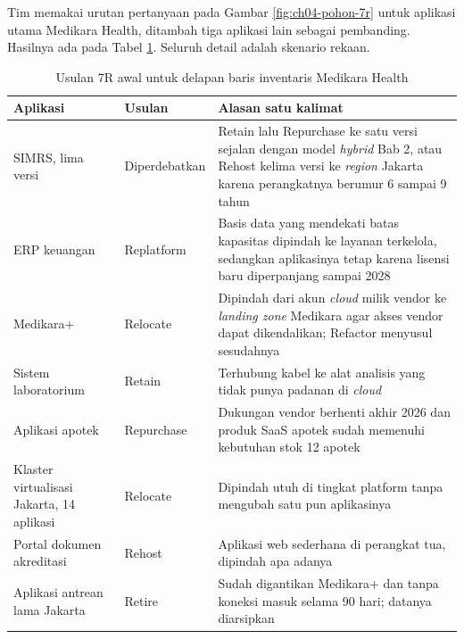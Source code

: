 \begin{kasus}[title={Kasus Medikara Health: Usulan 7R untuk Lima Aplikasi Utama}]
  Tim memakai urutan pertanyaan pada Gambar \ref{fig:ch04-pohon-7r} untuk aplikasi utama
  Medikara Health, ditambah tiga aplikasi lain sebagai pembanding. Hasilnya ada pada Tabel
  \ref{tab:ch04-usulan-medikara}. Seluruh detail adalah skenario rekaan.

  \begin{table}[H]
    \centering
    \footnotesize
    \caption{Usulan 7R awal untuk delapan baris inventaris Medikara Health}
    \label{tab:ch04-usulan-medikara}
    \begin{tabularx}{\linewidth}{>{\raggedright\arraybackslash}p{2.4cm}
                                 >{\raggedright\arraybackslash}p{2.1cm}
                                 >{\raggedright\arraybackslash}X}
      \hline
      \textbf{Aplikasi} & \textbf{Usulan} & \textbf{Alasan satu kalimat} \\
      \hline
      SIMRS, lima versi & Diperdebatkan & Retain lalu Repurchase ke satu versi sejalan
        dengan model \textit{hybrid} Bab 2, atau Rehost kelima versi ke \textit{region}
        Jakarta karena perangkatnya berumur 6 sampai 9 tahun \\
      \hline
      ERP keuangan & Replatform & Basis data yang mendekati batas kapasitas dipindah ke
        layanan terkelola, sedangkan aplikasinya tetap karena lisensi baru diperpanjang
        sampai 2028 \\
      \hline
      Medikara+ & Relocate & Dipindah dari akun \textit{cloud} milik vendor ke
        \textit{landing zone} Medikara agar akses vendor dapat dikendalikan; Refactor
        menyusul sesudahnya \\
      \hline
      Sistem laboratorium & Retain & Terhubung kabel ke alat analisis yang tidak punya
        padanan di \textit{cloud} \\
      \hline
      Aplikasi apotek & Repurchase & Dukungan vendor berhenti akhir 2026 dan produk SaaS
        apotek sudah memenuhi kebutuhan stok 12 apotek \\
      \hline
      Klaster virtualisasi Jakarta, 14 aplikasi & Relocate & Dipindah utuh di tingkat
        platform tanpa mengubah satu pun aplikasinya \\
      \hline
      Portal dokumen akreditasi & Rehost & Aplikasi web sederhana di perangkat tua, dipindah
        apa adanya \\
      \hline
      Aplikasi antrean lama Jakarta & Retire & Sudah digantikan Medikara+ dan tanpa koneksi
        masuk selama 90 hari; datanya diarsipkan \\
      \hline
    \end{tabularx}
  \end{table}


\end{kasus}
